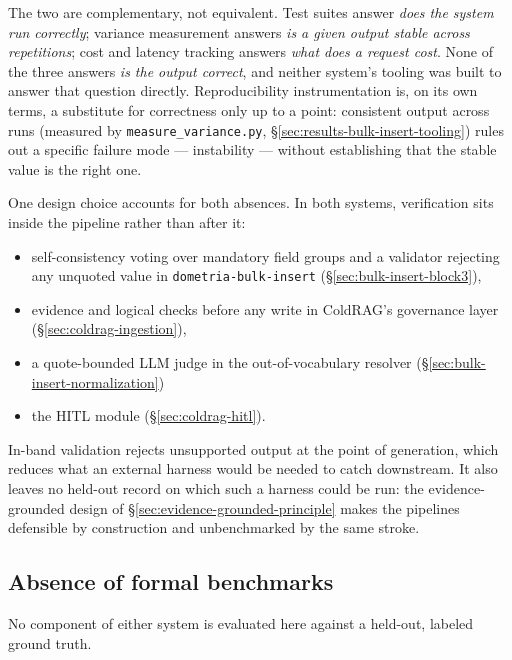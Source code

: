\vspace{0.3cm}

The two are complementary, not equivalent. Test suites answer \emph{does the system run correctly}; variance measurement answers \emph{is a given output stable across repetitions}; cost and latency tracking answers \emph{what does a request cost}. None of the three answers \emph{is the output correct}, and neither system's tooling was built to answer that question directly. Reproducibility instrumentation is, on its own terms, a substitute for correctness only up to a point: consistent output across runs (measured by \texttt{measure\_variance.py}, \S\ref{sec:results-bulk-insert-tooling}) rules out a specific failure mode — instability — without establishing that the stable value is the right one.

\vspace{0.3cm}

One design choice accounts for both absences. In both systems, verification sits inside the pipeline rather than after it: 
\begin{itemize}
\item self-consistency voting over mandatory field groups and a validator rejecting any unquoted value in \texttt{dometria-bulk-insert} (\S\ref{sec:bulk-insert-block3}), 
\item evidence and logical checks before any write in ColdRAG's governance layer (\S\ref{sec:coldrag-ingestion}), 
\item a quote-bounded LLM judge in the out-of-vocabulary resolver (\S\ref{sec:bulk-insert-normalization})
\item the HITL module (\S\ref{sec:coldrag-hitl}). 
\end{itemize}
In-band validation rejects unsupported output at the point of generation, which reduces what an external harness would be needed to catch downstream. It also leaves no held-out record on which such a harness could be run: the evidence-grounded design of \S\ref{sec:evidence-grounded-principle} makes the pipelines defensible by construction and unbenchmarked by the same stroke.

\subsection{Absence of formal benchmarks}
\label{sec:results-limitations}

No component of either system is evaluated here against a held-out, labeled ground truth. 


